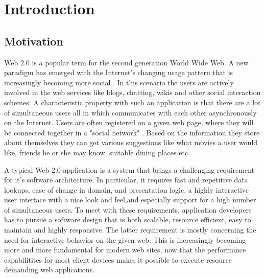 	\chapter{Introduction}     %
	\section {Motivation}
Web 2.0 is a popular term for the second generation
                World Wide Web. A new paradigm has emerged with the
                Internet's changing usage pattern that is increasingly
                becoming more social \cite{web20}. In  this scenario the users are
                actively involved in the web services like blogs,
                chatting, wikis and other social interaction
                schemes. A characteristic property with such an
                application is that there are a lot of simultaneous
                users all in which communicates with each other
                asynchronously on the Internet. Users are often
                registered on a given web page, where they will be
                connected together in a "social network" . Based on
                the information they store about themselves they can
                get various suggestions like what movies a user would
                like, friends he or she may know, suitable dining
                places etc.  

A typical Web 2.0 application is a system that brings
                a challenging requirement for it's software
                architecture. In particular, it requires fast and
                repetitive data lookups, ease of change in domain,-and
                presentation logic, a highly interactive user
                interface with a nice look and feel,and especially support for a high number of
                simultaneous users. To meet with these requirements,
                application developers has to pursue a software
                design that is both scalable, resource efficient, easy
                to maintain and highly responsive. The latter
                requirement is mostly concerning the need for
                interactive behavior on the given web. This is
                increasingly becoming more and more fundamental for
                modern web sites, now that the performance capabilitites for
                most client devices makes it possible to execute
                resource demanding web applications.


